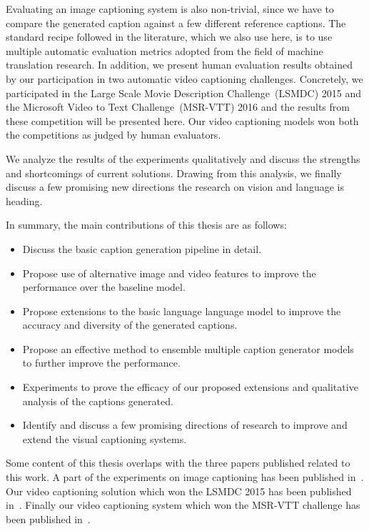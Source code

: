 Evaluating an image captioning system is also non-trivial, since we have to
compare the generated caption against a few different reference captions.
The standard recipe followed in the literature, which we also use here, is to
use multiple automatic evaluation metrics adopted from the field of machine
translation research. 
In addition, we present human evaluation results obtained by our participation
in two automatic video captioning challenges.
Concretely, we participated in the Large Scale Movie Description
Challenge~(LSMDC) 2015 and the Microsoft Video to Text Challenge~(MSR-VTT) 2016
and the results from these competition will be presented here.
Our video captioning models won both the competitions as judged by human
evaluators.

We analyze the results of the experiments qualitatively and discuss the
strengths and shortcomings of current solutions. 
Drawing from this analysis, we finally discuss a few promising new directions the
research on vision and language is heading.

In summary, the main contributions of this thesis are as follows:
\begin{itemize}
  \item Discuss the basic caption generation pipeline in detail. 
  \item Propose use of alternative image and video features to improve the
          performance over the baseline model.
  \item Propose extensions to the basic language language model to improve the
          accuracy and diversity of the generated captions.
  \item Propose an effective method to ensemble multiple caption generator
          models to further improve the performance.
  \item Experiments to prove the efficacy of our proposed extensions and qualitative
          analysis of the captions generated.
  \item Identify and discuss a few promising directions of research to improve
          and extend the visual captioning systems.
       
\end{itemize}

Some content of this thesis overlaps with the three papers published related to
this work.
A part of the experiments on image captioning has been published
in~\cite{ShettyACMMM2016Wrk}.
Our video captioning solution which won the LSMDC 2015 has been published
in~\cite{shetty2015video}.
Finally our video captioning system which won the MSR-VTT challenge has been
published in~\cite{ShettyACMMM2016}.
